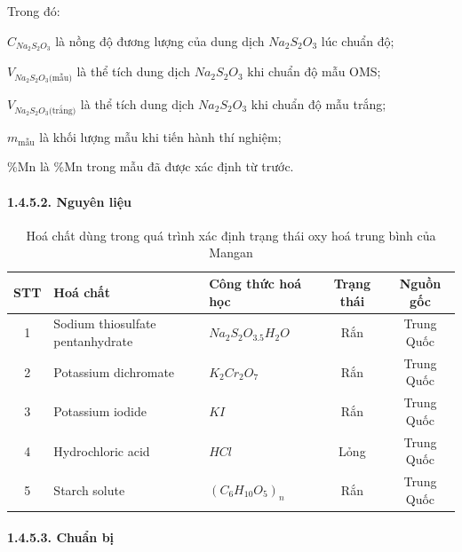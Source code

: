 \documentclass{article} %
\begin{document}
Trong đó:
    
        \hspace{1.2cm} $C_{Na_2S_2O_3}$ là nồng độ đương lượng của dung dịch $Na_2S_2O_3$ lúc chuẩn độ;
        
        \hspace{1.2cm} $V_{Na_2S_2O_3 \text{(mẫu)}}$ là thể tích dung dịch $Na_2S_2O_3$ khi chuẩn độ mẫu OMS;
        
        \hspace{1.2cm} $V_{Na_2S_2O_3 \text{(trắng)}}$ là thể tích dung dịch $Na_2S_2O_3$ khi chuẩn độ mẫu trắng;

        \hspace{1.2cm} $m_{\text{mẫu}}$ là khối lượng mẫu khi tiến hành thí nghiệm;

        \hspace{1.2cm} \%Mn là \%Mn trong mẫu đã được xác định từ trước.

\paragraph*{1.4.5.2. Nguyên liệu}
\leavevmode

\begin{table}[H]
    \centering
    \begin{tabular}{@{}|c|p{4.5cm}|p{3cm}|c|c|@{}} \hline
        \textbf{STT} & \centering \textbf{Hoá chất} & \centering \textbf{Công thức hoá học} & \textbf{Trạng thái} & \textbf{Nguồn gốc}\\ \hline
        1 & \centering Sodium thiosulfate pentanhydrate & \centering $Na_2S_2O_3.5H_2O$ & Rắn & Trung Quốc\\ \hline
        2 & \centering Potassium dichromate & \centering $K_2Cr_2O_7$ & Rắn & Trung Quốc\\ \hline
        3 & \centering Potassium iodide & \centering $KI$ & Rắn & Trung Quốc\\ \hline
        4 & \centering Hydrochloric acid & \centering $HCl$ & Lỏng & Trung Quốc\\ \hline
        5 & \centering Starch solute & \centering $(C_6H_{10}O_5)_n$ & Rắn & Trung Quốc\\ \hline
    \end{tabular}
    \caption{\centering Hoá chất dùng trong quá trình xác định trạng thái oxy hoá trung bình của Mangan}
\end{table}

\paragraph*{1.4.5.3. Chuẩn bị}
\leavevmode
\end{document}
